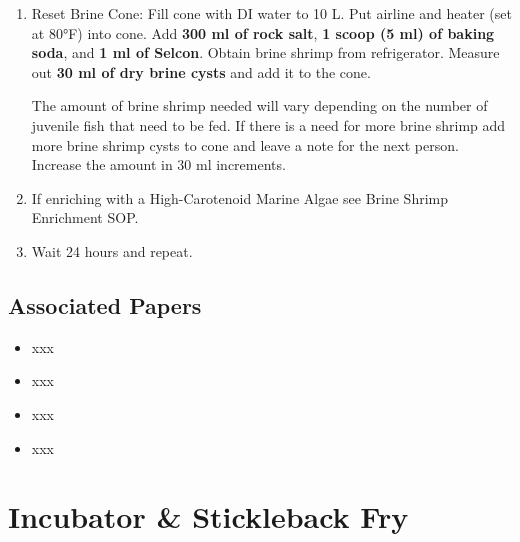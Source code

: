 \documentclass[
  letterpaper,
  DIV=11,
  numbers=noendperiod]{scrreprt}
\providecommand{\tightlist}{%
  \setlength{\itemsep}{0pt}\setlength{\parskip}{0pt}}\usepackage{longtable,booktabs,array}
\begin{document}
\begin{enumerate}
\def\labelenumi{\arabic{enumi}.}
\setcounter{enumi}{2}
\item
  Reset Brine Cone: Fill cone with DI water to 10 L. Put airline and
  heater (set at 80°F) into cone. Add \textbf{300 ml of rock salt},
  \textbf{1 scoop (5 ml) of baking soda}, and \textbf{1 ml of Selcon}.
  Obtain brine shrimp from refrigerator. Measure out \textbf{30 ml of
  dry brine cysts} and add it to the cone.

  \begin{tcolorbox}[enhanced jigsaw, rightrule=.15mm, title=\textcolor{quarto-callout-note-color}{\faInfo}\hspace{0.5em}{NOTE}, titlerule=0mm, opacitybacktitle=0.6, toprule=.15mm, bottomrule=.15mm, opacityback=0, left=2mm, colframe=quarto-callout-note-color-frame, breakable, coltitle=black, colback=white, colbacktitle=quarto-callout-note-color!10!white, bottomtitle=1mm, leftrule=.75mm, toptitle=1mm, arc=.35mm]

  The amount of brine shrimp needed will vary depending on the number of
  juvenile fish that need to be fed. If there is a need for more brine
  shrimp add more brine shrimp cysts to cone and leave a note for the
  next person. Increase the amount in 30 ml increments.

  \end{tcolorbox}
\item
  If enriching with a High-Carotenoid Marine Algae see Brine Shrimp
  Enrichment SOP.
\item
  Wait 24 hours and repeat.
\end{enumerate}

\hypertarget{associated-papers-28}{%
\section{Associated Papers}\label{associated-papers-28}}

\begin{itemize}
\tightlist
\item
  xxx
\item
  xxx
\item
  xxx
\item
  xxx
\end{itemize}

\hypertarget{sec-husbandry-incubator_use}{%
\chapter{Incubator \& Stickleback
Fry}\label{sec-husbandry-incubator_use}}
\end{document}
